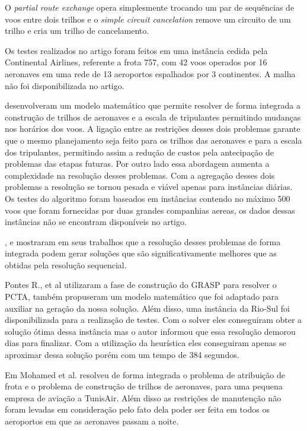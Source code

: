 O \textit{partial route exchange} opera simplesmente trocando um par de
sequências de voos entre dois trilhos e o \textit{simple circuit cancelation}
remove um circuito de um trilho e cria um trilho de cancelamento. 

Os testes realizados no artigo foram feitos em uma instância cedida pela
Continental Airlines, referente a frota 757, com 42 voos operados por 16
aeronaves em uma rede de 13 aeroportos espalhados por 3 continentes. A malha
não foi disponibilizada no artigo.

		
\cite{mercier2007} desenvolveram um modelo matemático que permite resolver de
forma integrada a construção de trilhos de aeronaves e a escala de tripulantes
permitindo mudanças nos horários dos voos. A ligação entre as restrições desses
dois problemas garante que o mesmo planejamento seja feito para os trilhos das
aeronaves e para a escala dos tripulantes, permitindo assim a redução de custos
pela antecipação de problemas das etapas futuras. Por outro lado essa abordagem
aumenta a complexidade na resolução desses problemas. Com a agregação desses
dois problemas a resolução se tornou pesada e viável apenas para instâncias
diárias. Os testes do algoritmo foram baseados em instâncias contendo no máximo
500 voos que foram fornecidas por duas grandes companhias aereas, os dados
dessas instâncias não se encontram disponíveis no artigo.

\cite{cordeau2001}, \cite{klabjan2002} e \cite{mainville2003} mostraram em seus
trabalhos que a resolução desses problemas de forma integrada podem gerar
soluções que são significativamente melhores que as obtidas pela resolução
sequencial.

  		
Pontes R., et al \cite{pontes2002} utilizaram a fase de construção do GRASP
para resolver o PCTA, também propuseram um modelo matemático que foi
adaptado para auxiliar na geração da nossa solução. Além disso, uma instância
da Rio-Sul foi disponibilizada para a realização de testes. Com o solver eles
conseguiram obter a solução ótima dessa instância mas o autor informou que
essa resolução demorou dias para finalizar. Com a utilização da heurística
eles conseguiram apenas se aproximar dessa solução porém com um tempo de 384
segundos. 
		
Em \cite{mohamed2011} Mohamed et al. resolveu de forma integrada o problema
de atribuição de frota e o problema de construção de trilhos de aeronaves,
para uma pequena empresa de aviação a TunisAir. Além disso as restrições de
manutenção não foram levadas em consideração pelo fato dela poder ser feita
em todos os aeroportos em que as aeronaves passam a noite.
		
 